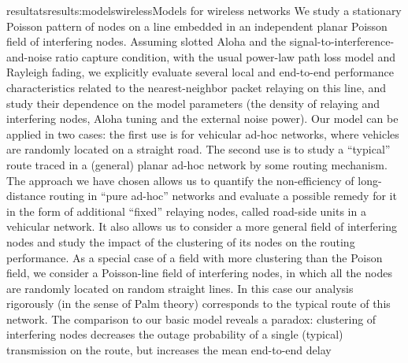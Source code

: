 \documentclass{ra2016}
\begin{document}
\begin{module}{resultats}{results:modelswireless}{Models for wireless networks}
We study a stationary Poisson
pattern of nodes on a line embedded in an independent planar
Poisson field of interfering nodes. Assuming slotted Aloha and
the signal-to-interference-and-noise ratio capture condition, with
the usual power-law path loss model and Rayleigh fading, we
explicitly evaluate several local and end-to-end performance
characteristics related to the nearest-neighbor packet relaying on
this line, and study their dependence on the model parameters
(the density of relaying and interfering nodes, Aloha tuning and
the external noise power). Our model can be applied in two cases:
the first use is for vehicular ad-hoc networks, where vehicles are
randomly located on a straight road. The second use is to study
a “typical” route traced in a (general) planar ad-hoc network by
some routing mechanism. The approach we have chosen allows
us to quantify the non-efficiency of long-distance routing in “pure
ad-hoc” networks and evaluate a possible remedy for it in the
form of additional “fixed” relaying nodes, called road-side units in
a vehicular network. It also allows us to consider a more general
field of interfering nodes and study the impact of the clustering
of its nodes on the routing performance. As a special case of
a field with more clustering than the Poison field, we consider
a Poisson-line field of interfering nodes, in which all the nodes
are randomly located on random straight lines. In this case our
analysis rigorously (in the sense of Palm theory) corresponds to
the typical route of this network. The comparison to our basic
model reveals a paradox: clustering of interfering nodes decreases
the outage probability of a single (typical) transmission on the
route, but increases the mean end-to-end delay

\end{module}





\end{document}
